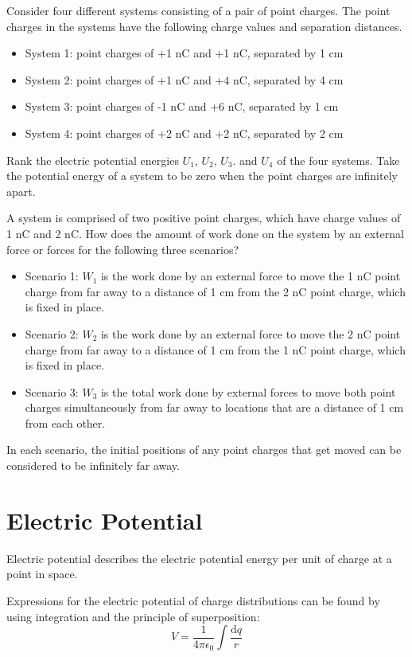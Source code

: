 \documentclass[../em.tex]{subfiles}
\begin{document}
\pagebreak
\ex Consider four different systems consisting of a pair of point charges. The point charges in the systems have the following charge values and separation distances.
\begin{itemize}
    \item System 1: point charges of +1 nC and +1 nC, separated by 1 cm 
    \item System 2: point charges of +1 nC and +4 nC, separated by 4 cm 
    \item System 3: point charges of -1 nC and +6 nC, separated by 1 cm 
    \item System 4: point charges of +2 nC and +2 nC, separated by 2 cm
\end{itemize}
Rank the electric potential energies $U_1$, $U_2$, $U_3$. and $U_4$ of the four systems. Take the potential energy of a system to be zero when the point charges are infinitely apart.

\ex A system is comprised of two positive point charges, which have charge values of 1 nC and 2 nC. How does the amount of work done on the system by an external force or forces for the following three scenarios?
\begin{itemize}
    \item Scenario 1: $W_1$ is the work done by an external force to move the 1 nC point charge from far away to a distance of 1 cm from the 2 nC point charge, which is fixed in place.
    \item Scenario 2: $W_2$ is the work done by an external force to move the 2 nC point charge from far away to a distance of 1 cm from the 1 nC point charge, which is fixed in place.
    \item Scenario 3: $W_3$ is the total work done by external forces to move both point charges simultaneously from far away to locations that are a distance of 1 cm from each other.
\end{itemize}
In each scenario, the initial positions of any point charges that get moved can be considered to be infinitely far away.

\section{Electric Potential}
Electric potential describes the electric potential energy per unit of charge at a point in space.

Expressions for the electric potential of charge distributions can be found by
using integration and the principle of superposition:
\[V=\frac{1}{4\pi\epsilon_0}\int \frac{\mathrm{d}q}{r}\]
\end{document}
